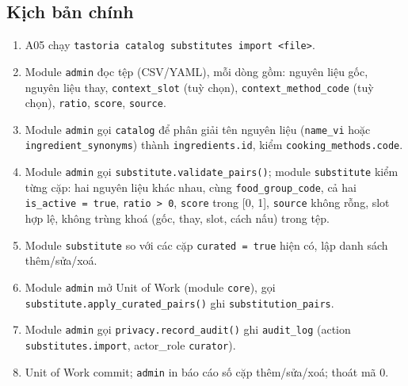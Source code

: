 \subsection{Kịch bản chính}
\begin{enumerate}
\item A05 chạy {\small\texttt{tastoria catalog substitutes import <file>}}.
\item Module {\small\texttt{admin}} đọc tệp (CSV/\allowbreak{}YAML), mỗi dòng gồm: nguyên liệu gốc, nguyên liệu thay, {\small\texttt{context\_\allowbreak{}\allowbreak{}slot}} (tuỳ chọn), {\small\texttt{context\_\allowbreak{}\allowbreak{}method\_\allowbreak{}\allowbreak{}code}} (tuỳ chọn), {\small\texttt{ratio}}, {\small\texttt{score}}, {\small\texttt{source}}.
\item Module {\small\texttt{admin}} gọi {\small\texttt{catalog}} để phân giải tên nguyên liệu ({\small\texttt{name\_\allowbreak{}\allowbreak{}vi}} hoặc {\small\texttt{ingredient\_\allowbreak{}\allowbreak{}synonyms}}) thành {\small\texttt{ingredients.\allowbreak{}id}}, kiểm {\small\texttt{cooking\_\allowbreak{}\allowbreak{}methods.\allowbreak{}code}}.
\item Module {\small\texttt{admin}} gọi {\small\texttt{substitute.\allowbreak{}validate\_\allowbreak{}\allowbreak{}pairs()}}; module {\small\texttt{substitute}} kiểm từng cặp: hai nguyên liệu khác nhau, cùng {\small\texttt{food\_\allowbreak{}\allowbreak{}group\_\allowbreak{}\allowbreak{}code}}, cả hai {\small\texttt{is\_\allowbreak{}\allowbreak{}active = true}}, {\small\texttt{ratio > 0}}, {\small\texttt{score}} trong [0, 1], {\small\texttt{source}} không rỗng, slot hợp lệ, không trùng khoá (gốc, thay, slot, cách nấu) trong tệp.
\item Module {\small\texttt{substitute}} so với các cặp {\small\texttt{curated = true}} hiện có, lập danh sách thêm/\allowbreak{}sửa/\allowbreak{}xoá.
\item Module {\small\texttt{admin}} mở Unit of Work (module {\small\texttt{core}}), gọi {\small\texttt{substitute.\allowbreak{}apply\_\allowbreak{}\allowbreak{}curated\_\allowbreak{}\allowbreak{}pairs()}} ghi {\small\texttt{substitution\_\allowbreak{}\allowbreak{}pairs}}.
\item Module {\small\texttt{admin}} gọi {\small\texttt{privacy.\allowbreak{}record\_\allowbreak{}\allowbreak{}audit()}} ghi {\small\texttt{audit\_\allowbreak{}\allowbreak{}log}} (action {\small\texttt{substitutes.\allowbreak{}import}}, actor\_\allowbreak{}role {\small\texttt{curator}}).
\item Unit of Work commit; {\small\texttt{admin}} in báo cáo số cặp thêm/\allowbreak{}sửa/\allowbreak{}xoá; thoát mã 0.
\end{enumerate}
